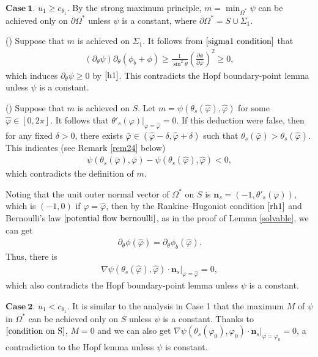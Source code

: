 \documentclass[reqno,12pt]{amsart}
\numberwithin{equation}{section}
\begin{document}
$\mathbf{Case~1.}$ 
$u_1\geq c_{\theta_1}$. By the strong maximum principle, $m = \min_{\Omega^*} \psi$ can be achieved only on $\partial\Omega^*$ unless $\psi$ is a constant, where $\partial \Omega^*=S\cup \Sigma_1$.

() Suppose that $m$ is achieved on $\Sigma_1 $. It follows from $\eqref{sigma1 condition}$ that
\begin{align}
	(\partial_\theta \psi)\partial_\theta(\phi_b+\phi)\geq\frac{1}{\sin^2\theta}(\frac{\partial\phi}{\partial\varphi})^2\geq0,
\end{align}
which induces $\partial_\theta \psi\geq0$ by $\eqref{h1}$. This contradicts the Hopf boundary-point lemma unless $\psi$ is a constant.

() Suppose that $m$ is achieved on $S$. Let $m=\psi(\theta_s(\hat{\varphi}),\hat{\varphi})$ for some $\hat{\varphi}\in[0,2\pi]$. It follows that $\theta'_s(\varphi)|_{\varphi=\hat{\varphi}}=0$. If this deduction were false, then
for any fixed $\delta>0$, there exists $\bar{\varphi}\in (\hat{\varphi}-\delta, \hat{\varphi}+\delta)$ such that $\theta_{s}(\bar{\varphi})>\theta_s(\hat{\varphi})$. This indicates (see Remark \ref{rem24} below)
\begin{align}\label{contradiction1}
	\psi(\theta_{s}(\bar{\varphi}),\bar{\varphi})-\psi(\theta_s(\hat{\varphi}),\hat{\varphi})<0,
\end{align} 
which contradicts the definition of $m$. 

Noting that the unit outer normal vector of $\Omega^*$ on $S$ is $\mathbf{n}_s=(-1,\theta'_s(\varphi))$, which is $(-1,0)$ if $\varphi=\hat{\varphi}$, then by the Rankine–Hugoniot condition $\eqref{rh1}$ and Bernoulli's law $\eqref{potential flow bernoulli}$, as in the proof of Lemma \ref{solvable}, we can get
\begin{align}
	\partial_\theta\phi(\hat{\varphi})=\partial_\theta\phi_b(\hat{\varphi}).
\end{align}
Thus, there is
\begin{align}
	\nabla\psi(\theta_s(\hat{\varphi}),\hat{\varphi})\cdot \mathbf{n}_s|_{\varphi=\hat{\varphi}}=0,
\end{align}
which also contradicts the Hopf boundary-point lemma unless $\psi$ is a constant.

$\mathbf{Case~2. }$
$u_1 < c_{\theta_1}$. It is similar to the analysis in Case 1 that the maximum $M$ of $\psi$ in $\Omega^*$ can be achieved only on $S$ unless $\psi$ is a constant. Thanks to $\eqref{condition on S}$, $M = 0$ and we can also get $\nabla \psi(\theta_s(\varphi_0),\varphi_0)\cdot\mathbf{n}_s|_{\varphi=\varphi_0} = 0$, a contradiction to the Hopf lemma unless $\psi$ is constant.
\end{document}
